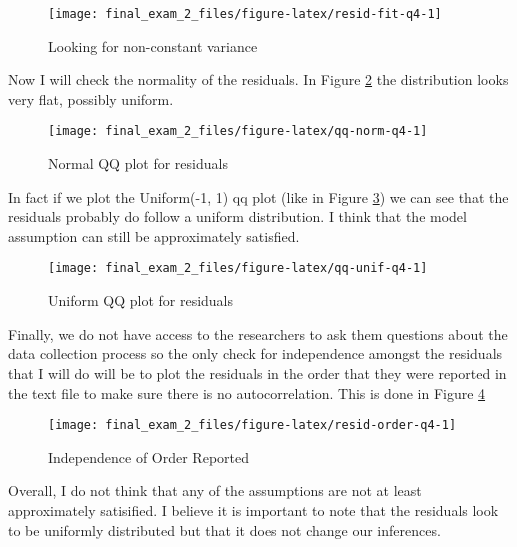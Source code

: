 \documentclass[]{book}
\begin{document}
\begin{figure}

{\centering \texttt{[image: final\_exam\_2\_files/figure-latex/resid-fit-q4-1]} 

}

\caption{Looking for non-constant variance}\label{fig:resid-fit-q4}
\end{figure}

Now I will check the normality of the residuals. In Figure \ref{fig:qq-norm-q4} the distribution looks very flat, possibly uniform.

\begin{figure}

{\centering \texttt{[image: final\_exam\_2\_files/figure-latex/qq-norm-q4-1]} 

}

\caption{Normal QQ plot for residuals}\label{fig:qq-norm-q4}
\end{figure}

In fact if we plot the Uniform(-1, 1) qq plot (like in Figure \ref{fig:qq-unif-q4}) we can see that the residuals probably do follow a uniform distribution. I think that the model assumption can still be approximately satisfied.

\begin{figure}

{\centering \texttt{[image: final\_exam\_2\_files/figure-latex/qq-unif-q4-1]} 

}

\caption{Uniform QQ plot for residuals}\label{fig:qq-unif-q4}
\end{figure}

Finally, we do not have access to the researchers to ask them questions about the data collection process so the only check for independence amongst the residuals that I will do will be to plot the residuals in the order that they were reported in the text file to make sure there is no autocorrelation. This is done in Figure \ref{fig:resid-order-q4}

\begin{figure}

{\centering \texttt{[image: final\_exam\_2\_files/figure-latex/resid-order-q4-1]} 

}

\caption{Independence of Order Reported}\label{fig:resid-order-q4}
\end{figure}

Overall, I do not think that any of the assumptions are not at least approximately satisified. I believe it is important to note that the residuals look to be uniformly distributed but that it does not change our inferences.
\end{document}
